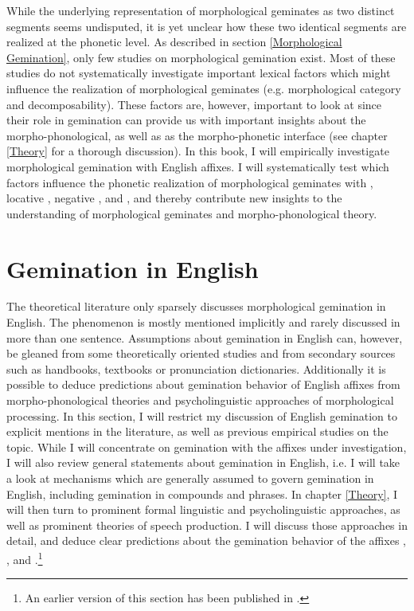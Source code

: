 While the underlying representation of morphological geminates as two distinct segments seems undisputed, it is yet unclear how these two identical segments are realized at the phonetic level. As described in section \ref{Morphological Gemination}, only few studies on morphological gemination exist. Most of these studies do not systematically investigate important lexical factors which might influence the realization of morphological geminates (e.g. morphological category and decomposability). These factors are, however, important to look at since their role in gemination can provide us with important insights about the morpho-phonological, as well as as the morpho-phonetic interface (see chapter \ref{Theory} for a thorough discussion). 
In this book, I will empirically investigate morphological gemination with English affixes. I will systematically test which factors influence the phonetic realization of morphological geminates with , locative , negative ,  and , and thereby contribute new insights to the understanding of morphological geminates and morpho-phonological theory.


\section{Gemination in English} \label{Gemination in English}

The theoretical literature only sparsely discusses morphological gemination in English. The phenomenon is mostly mentioned implicitly and rarely discussed in more than one sentence.  Assumptions about gemination in English can, however, be gleaned from some  theoretically oriented studies and from secondary sources such as handbooks, textbooks or pronunciation dictionaries. Additionally it is possible to deduce predictions about gemination behavior of English affixes from morpho-phonological theories and psycholinguistic approaches of morphological processing. In this section, I will restrict my discussion of English gemination to explicit mentions in the literature, as well as previous empirical studies on the topic. While I will concentrate on gemination with the affixes under investigation, I will also review general statements about gemination in English, i.e. I will take a look at mechanisms which are generally assumed to govern gemination in English, including gemination in compounds and phrases.
In chapter \ref{Theory}, I will then turn to prominent formal linguistic and psycholinguistic approaches, as well as prominent theories of speech production. I will discuss those approaches in detail, and deduce clear predictions about the gemination behavior of the affixes , ,  and .\footnote{An earlier version of this section has been published in \cite{BenHedia.2017}.}
\label{assumptions}
 


